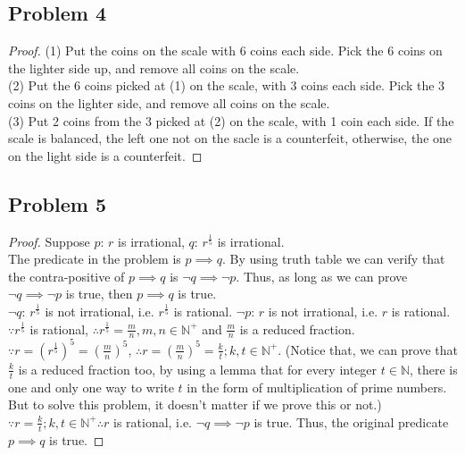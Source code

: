 \documentclass{article}
\begin{document}
\subsection{Problem 4}
\begin{proof}
(1) Put the coins on the scale with 6 coins each side. Pick the 6 coins on the lighter side up, and remove all coins on the scale. \\
(2) Put the 6 coins picked at (1) on the scale, with 3 coins each side. Pick the 3 coins on the lighter side, and remove all coins on the scale. \\
(3) Put 2 coins from the 3 picked at (2) on the scale, with 1 coin each side. If the scale is balanced, the left one not on the sacle is a counterfeit, otherwise, the one on the light side is a counterfeit.
\end{proof}
\subsection{Problem 5}
\begin{proof}
Suppose $p$: $r$ is irrational, $q$: $r^{\frac{1}{5}}$ is irrational.
\\ The predicate in the problem is $p \implies q$. By using truth table we can verify that the contra-positive of $p \implies q$ is $\neg q \implies \neg p$. Thus, as long as we can prove $\neg q \implies \neg p$ is true, then $p \implies q$ is true. \\
$\neg q$: $r^{\frac{1}{5}}$ is not irrational, i.e. $r^{\frac{1}{5}}$ is rational.
$\neg p$: $r$ is not irrational, i.e. $r$ is rational.
\\ $\because r^{\frac{1}{5}}$ is rational, $\therefore r^{\frac{1}{5}}=\frac{m}{n}, m,n \in \mathbb{N}^+$ and $\frac{m}{n}$ is a reduced fraction. \\
$\because r = (r^{\frac{1}{5}})^{5} = (\frac{m}{n})^5$, $\therefore r = (\frac{m}{n})^5 = \frac{k}{t}; k,t \in \mathbb{N}^+$. (Notice that, we can prove that $\frac{k}{t}$ is a reduced fraction too, by using a lemma that for every integer $t \in \mathbb{N}$, there is one and only one way to write $t$ in the form of multiplication of prime numbers. But to solve this problem, it doesn't matter if we prove this or not.)
\\ $\because r = \frac{k}{t}; k,t \in \mathbb{N}^+ \therefore r$ is rational, i.e. $\neg q \implies \neg p$ is true. Thus, the original predicate $p \implies q$ is true.
\end{proof}
\end{document}
